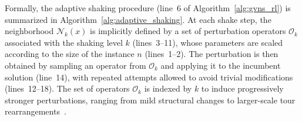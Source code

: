 \documentclass[runningheads]{llncs}
\begin{document}








Formally, the adaptive shaking procedure (line~6 of Algorithm~\ref{alg:gvns_rl}) is summarized in Algorithm~\ref{alg:adaptive_shaking}. 
At each shake step, the neighborhood $\mathcal{N}_k(x)$ is implicitly defined by a set of perturbation operators $\mathcal{O}_k$ associated with the shaking level $k$ (lines~3–11), whose parameters are scaled according to the size of the instance $n$ (lines~1–2). 
The perturbation is then obtained by sampling an operator from $\mathcal{O}_k$ and applying it to the incumbent solution (line~14), with repeated attempts allowed to avoid trivial modifications (lines~12–18). The set of operators $\mathcal{O}_k$ is indexed by $k$ to induce progressively stronger perturbations, ranging from mild structural changes to larger-scale tour rearrangements~\cite{bentley1992fast,hoos2018stochastic}.
\end{document}
